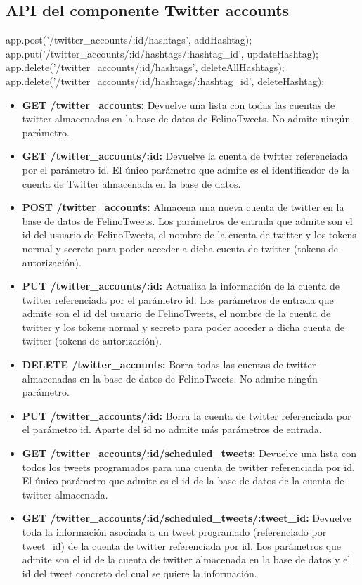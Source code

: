 \documentclass[a4paper]{article}
\begin{document}
	\subsection{API del componente Twitter accounts}

	app.post('/twitter\_accounts/:id/hashtags', addHashtag);
	app.put('/twitter\_accounts/:id/hashtags/:hashtag\_id', updateHashtag);
	app.delete('/twitter\_accounts/:id/hashtags', deleteAllHashtags);
	app.delete('/twitter\_accounts/:id/hashtags/:hashtag\_id', deleteHashtag);
	\begin{itemize}
		\item \textbf{GET /twitter\_accounts:} Devuelve una lista con todas las cuentas de twitter almacenadas en la base de datos de FelinoTweets. No admite ningún parámetro.
		\item \textbf{GET /twitter\_accounts/:id:} Devuelve la cuenta de twitter referenciada por el parámetro id. El único parámetro que admite es el identificador de la cuenta de Twitter almacenada en la base de datos.
		\item \textbf{POST /twitter\_accounts:} Almacena una nueva cuenta de twitter en la base de datos de FelinoTweets. Los parámetros de entrada que admite son el id del usuario de FelinoTweets, el nombre de la cuenta de twitter y los tokens normal y secreto para poder acceder a dicha cuenta de twitter (tokens de autorización).
		\item \textbf{PUT /twitter\_accounts/:id:} Actualiza la información de la cuenta de twitter referenciada por el parámetro id. Los parámetros de entrada que admite son el id del usuario de FelinoTweets, el nombre de la cuenta de twitter y los tokens normal y secreto para poder acceder a dicha cuenta de twitter (tokens de autorización).
		\item \textbf{DELETE /twitter\_accounts:} Borra todas las cuentas de twitter almacenadas en la base de datos de FelinoTweets. No admite ningún parámetro.
		\item \textbf{PUT /twitter\_accounts/:id:} Borra la cuenta de twitter referenciada por el parámetro id. Aparte del id no admite más parámetros de entrada.
		\item \textbf{GET /twitter\_accounts/:id/scheduled\_tweets:} Devuelve una lista con todos los tweets programados para una cuenta de twitter referenciada por id. El único parámetro que admite es el id de la base de datos de la cuenta de twitter almacenada.
		\item \textbf{GET /twitter\_accounts/:id/scheduled\_tweets/:tweet\_id:} Devuelve toda la información asociada a un tweet programado (referenciado por tweet\_id) de la cuenta de twitter referenciada por id. Los parámetros que admite son el id de la cuenta de twitter almacenada en la base de datos y el id del tweet concreto del cual se quiere la información.
		

\end{itemize}
\end{document}
